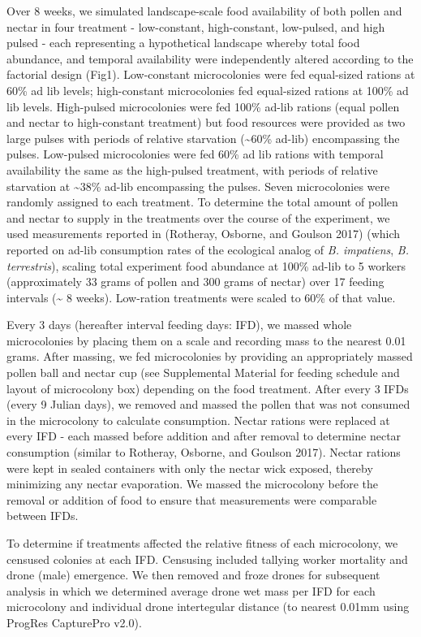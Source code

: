 \documentclass[11pt,]{article}
\begin{document}
Over 8 weeks, we simulated landscape-scale food availability of both
pollen and nectar in four treatment - low-constant, high-constant,
low-pulsed, and high pulsed - each representing a hypothetical landscape
whereby total food abundance, and temporal availability were
independently altered according to the factorial design (Fig1).
Low-constant microcolonies were fed equal-sized rations at 60\% ad lib
levels; high-constant microcolonies fed equal-sized rations at 100\% ad
lib levels. High-pulsed microcolonies were fed 100\% ad-lib rations
(equal pollen and nectar to high-constant treatment) but food resources
were provided as two large pulses with periods of relative starvation
(\textasciitilde{}60\% ad-lib) encompassing the pulses. Low-pulsed
microcolonies were fed 60\% ad lib rations with temporal availability
the same as the high-pulsed treatment, with periods of relative
starvation at \textasciitilde{}38\% ad-lib encompassing the pulses.
Seven microcolonies were randomly assigned to each treatment. To
determine the total amount of pollen and nectar to supply in the
treatments over the course of the experiment, we used measurements
reported in (Rotheray, Osborne, and Goulson 2017) (which reported on
ad-lib consumption rates of the ecological analog of \emph{B.
impatiens}, \emph{B. terrestris}), scaling total experiment food
abundance at 100\% ad-lib to 5 workers (approximately 33 grams of pollen
and 300 grams of nectar) over 17 feeding intervals (\textasciitilde{} 8
weeks). Low-ration treatments were scaled to 60\% of that value.

Every 3 days (hereafter interval feeding days: IFD), we massed whole
microcolonies by placing them on a scale and recording mass to the
nearest 0.01 grams. After massing, we fed microcolonies by providing an
appropriately massed pollen ball and nectar cup (see Supplemental
Material for feeding schedule and layout of microcolony box) depending
on the food treatment. After every 3 IFDs (every 9 Julian days), we
removed and massed the pollen that was not consumed in the microcolony
to calculate consumption. Nectar rations were replaced at every IFD -
each massed before addition and after removal to determine nectar
consumption (similar to Rotheray, Osborne, and Goulson 2017). Nectar
rations were kept in sealed containers with only the nectar wick
exposed, thereby minimizing any nectar evaporation. We massed the
microcolony before the removal or addition of food to ensure that
measurements were comparable between IFDs.

To determine if treatments affected the relative fitness of each
microcolony, we censused colonies at each IFD. Censusing included
tallying worker mortality and drone (male) emergence. We then removed
and froze drones for subsequent analysis in which we determined average
drone wet mass per IFD for each microcolony and individual drone
intertegular distance (to nearest 0.01mm using ProgRes CapturePro v2.0).
\end{document}
